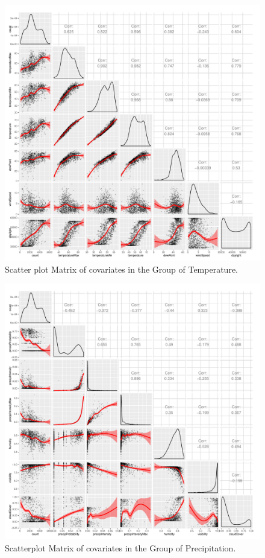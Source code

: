 \documentclass [11pt, proquest] {uwthesis}[2015/03/03]
\begin{document}
\begin{figure}
  \includegraphics[width=1\textwidth]{figures/matrix2}
  \caption{Scatter plot Matrix of covariates in the Group of Temperature.}
  \label{fig:temp_corr}
\end{figure}

\begin{figure}
   \includegraphics[width=1\textwidth]{figures/matrix1}
  \caption{Scatterplot Matrix of covariates in the Group of Precipitation.}
  \label{fig:precip_corr}
\end{figure}
\end{document}
